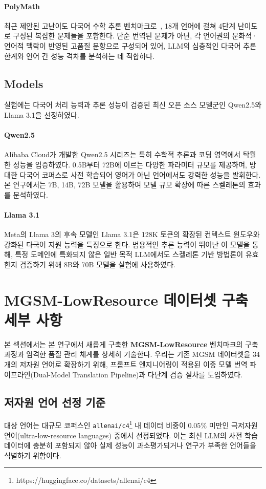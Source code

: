 \paragraph{PolyMath}
최근 제안된 고난이도 다국어 수학 추론 벤치마크로~\citep{wang2025polymath}, 18개 언어에 걸쳐 4단계 난이도로 구성된 복잡한 문제들을 포함한다. 단순 번역된 문제가 아닌, 각 언어권의 문화적·언어적 맥락이 반영된 고품질 문항으로 구성되어 있어, LLM의 심층적인 다국어 추론 한계와 언어 간 성능 격차를 분석하는 데 적합하다.

\subsection{Models}
실험에는 다국어 처리 능력과 추론 성능이 검증된 최신 오픈 소스 모델군인 Qwen2.5와 Llama 3.1을 선정하였다.

\paragraph{Qwen2.5}
Alibaba Cloud가 개발한 Qwen2.5 시리즈는 특히 수학적 추론과 코딩 영역에서 탁월한 성능을 입증하였다. 0.5B부터 72B에 이르는 다양한 파라미터 규모를 제공하며, 방대한 다국어 코퍼스로 사전 학습되어 영어가 아닌 언어에서도 강력한 성능을 발휘한다. 본 연구에서는 7B, 14B, 72B 모델을 활용하여 모델 규모 확장에 따른 스켈레톤의 효과를 분석하였다.

\paragraph{Llama 3.1}
Meta의 Llama 3의 후속 모델인 Llama 3.1은 128K 토큰의 확장된 컨텍스트 윈도우와 강화된 다국어 지원 능력을 특징으로 한다. 범용적인 추론 능력이 뛰어난 이 모델을 통해, 특정 도메인에 특화되지 않은 일반 목적 LLM에서도 스켈레톤 기반 방법론이 유효한지 검증하기 위해 8B와 70B 모델을 실험에 사용하였다.


\section{MGSM-LowResource 데이터셋 구축 세부 사항}
\label{appendix:mgsm-translation}

본 섹션에서는 본 연구에서 새롭게 구축한 \textbf{MGSM-LowResource} 벤치마크의 구축 과정과 엄격한 품질 관리 체계를 상세히 기술한다. 우리는 기존 MGSM 데이터셋을 34개의 저자원 언어로 확장하기 위해, 프롬프트 엔지니어링이 적용된 이중 모델 번역 파이프라인(Dual-Model Translation Pipeline)과 다단계 검증 절차를 도입하였다.

\subsection{저자원 언어 선정 기준}
대상 언어는 대규모 코퍼스인 \texttt{allenai/c4}\footnote{https://huggingface.co/datasets/allenai/c4} 내 데이터 비중이 $0.05\%$ 미만인 극저자원 언어(ultra-low-resource languages) 중에서 선정되었다. 이는 최신 LLM의 사전 학습 데이터에 충분히 포함되지 않아 실제 성능이 과소평가되거나 연구가 부족한 언어들을 식별하기 위함이다. 

